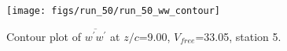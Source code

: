 \begin{figure}[H]
\centering
\texttt{[image: figs/run\_50/run\_50\_ww\_contour]}
\caption{Contour plot of $\overline{w^\prime w^\prime}$ at $z/c$=9.00, $V_{free}$=33.05, station 5.}
\end{figure}


